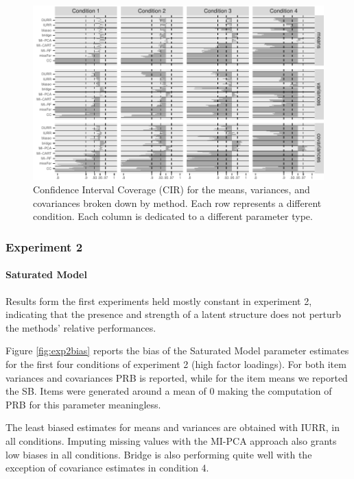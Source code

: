 \begin{figure}
	\includegraphics{../../output/graphs/exp1_CI.pdf}
\caption{Confidence Interval Coverage (CIR) for the means, variances, and covariances broken 
	down by method. 
	Each row represents a different condition. 
	Each column is dedicated to a different parameter type.}
\label{fig:exp1cir}
\end{figure}
	
\FloatBarrier %

\subsubsection{Experiment 2}

\paragraph{Saturated Model}

	Results form the first experiments held mostly constant in experiment 2, indicating that the presence and 
	strength of a latent structure does not perturb the methods' relative performances.

	Figure \ref{fig:exp2bias} reports the bias of the Saturated Model parameter estimates for the first
	four conditions of experiment 2 (high factor loadings). 
	For both item variances and covariances PRB is reported, while for the item means we reported the SB. 
	Items were generated around a mean of 0 making the computation of PRB for this parameter meaningless.

	The least biased estimates for means and variances are obtained with IURR, in all conditions.
	Imputing missing values with the MI-PCA approach also grants low biases in all conditions.
	Bridge is also performing quite well with the exception of covariance estimates in condition 4.

